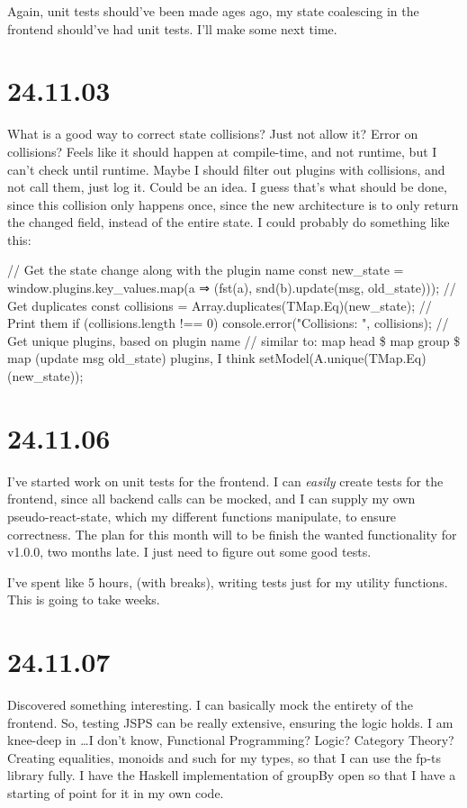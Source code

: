 Again, unit tests should've been made ages ago, my state coalescing in the
frontend should've had unit tests. I'll make some next time.


\section{24.11.03}

What is a good way to correct state collisions? Just not allow it? Error on
collisions? Feels like it should happen at compile-time, and not runtime, but I
can't check until runtime. Maybe I should filter out plugins with collisions,
and not call them, just log it. Could be an idea. I guess that's what should be
done, since this collision only happens once, since the new architecture is to
only return the changed field, instead of the entire state. I could probably do
something like this:

// Get the state change along with the plugin name
const new_state =
  window.plugins.key_values.map(a ⇒ (fst(a), snd(b).update(msg, old_state)));
// Get duplicates
const collisions = Array.duplicates(TMap.Eq)(new_state);
// Print them
if (collisions.length !== 0) console.error("Collisions: ", collisions);
// Get unique plugins, based on plugin name
// similar to: map head \$ map group \$ map (update msg old_state) plugins, I think
setModel(A.unique(TMap.Eq)(new_state));


\section{24.11.06}

I've started work on unit tests for the frontend. I can \textit{easily} create
tests for the frontend, since all backend calls can be mocked, and I can supply
my own pseudo-react-state, which my different functions manipulate, to ensure
correctness. The plan for this month will to be finish the wanted
functionality for v1.0.0, two months late. I just need to figure out some good
tests.

I've spent like 5 hours, (with breaks), writing tests just for my utility
functions. This is going to take weeks.


\section{24.11.07}

Discovered something interesting. I can basically mock the entirety of the
frontend. So, testing JSPS can be really extensive, ensuring the logic holds.
I am knee-deep in \dots I don't know, Functional Programming? Logic?
Category Theory? Creating equalities, monoids and such for my types, so that I
can use the fp-ts library fully. I have the Haskell implementation of groupBy
open so that I have a starting of point for it in my own code.

